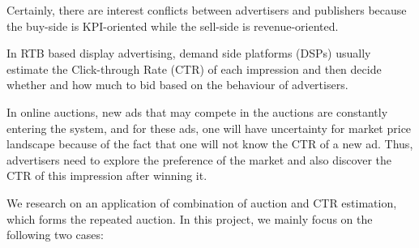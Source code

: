 Certainly, there are interest conflicts between advertisers and publishers because the buy-side is KPI-oriented while the sell-side is revenue-oriented.

In RTB based display advertising, demand side platforms (DSPs) usually estimate the Click-through Rate (CTR) of each impression and then decide whether and how much to bid based on the behaviour of advertisers.

In online auctions, new ads that may compete in the auctions are constantly entering the system, and for these ads, one will have uncertainty for market price landscape because of the fact that one will not know the CTR of a new ad. Thus, advertisers need to explore the preference of the market and also discover the CTR of this impression after winning it.

We research on an application of combination of auction and CTR estimation, which forms the repeated auction. In this project, we mainly focus on the following two cases:

